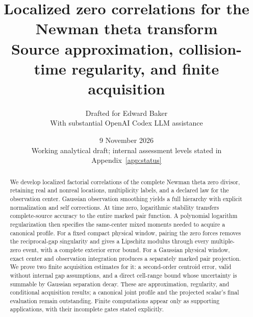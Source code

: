\documentclass[11pt]{article}
\title{Localized zero correlations for the Newman theta transform\\[4pt]
\large Source approximation, collision-time regularity, and finite acquisition}
\author{Drafted for Edward Baker\\\small With substantial OpenAI Codex LLM assistance}
\date{9 November 2026\\\small Working analytical draft; internal assessment levels stated in Appendix~\ref{app:status}}
\numberwithin{equation}{section}
\theoremstyle{definition}
\theoremstyle{remark}
\begin{document}
\maketitle
\begin{abstract}
We develop localized factorial correlations of the complete Newman theta
zero divisor, retaining real and nonreal locations, multiplicity labels,
and a declared law for the observation center. Gaussian observation
smoothing yields a full hierarchy with explicit normalization and self
corrections. At time zero, logarithmic stability transfers complete-source
accuracy to the entire marked pair function. A polynomial logarithm
regularization then specifies the same-center mixed moments needed to
acquire a canonical profile. For a fixed compact physical window, pairing
the zero forces removes the reciprocal-gap singularity and gives a
Lipschitz modulus through every multiple-zero event, with a complete
exterior error bound. For a Gaussian physical window, exact center and
observation integration produces a separately marked pair projection.
We prove two finite acquisition estimates for it: a second-order centroid
error, valid without internal gap assumptions, and a direct cell-range
bound whose uncertainty is summable by Gaussian separation decay. These
are approximation, regularity, and conditional acquisition results; a
canonical joint profile and the projected scalar's final evaluation
remain outstanding. Finite computations appear only as supporting
applications, with their incomplete gates stated explicitly.
\end{abstract}
\begingroup
\small
\makeatletter
\renewcommand{\l@section}{\@dottedtocline{1}{0em}{1.6em}}
\makeatother
\tableofcontents
\endgroup
\clearpage











\appendix









\end{document}
